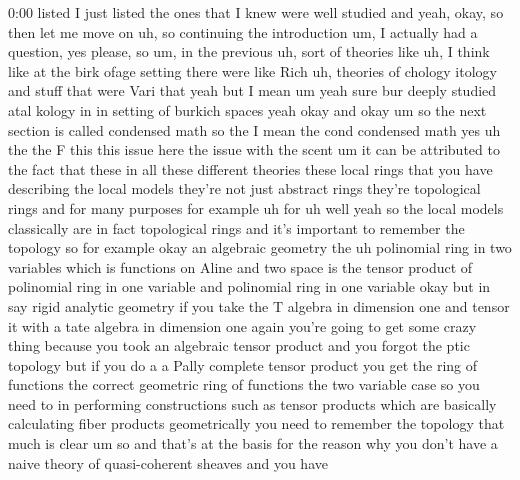 \begin{unfinished}{0:00}
 listed I just listed the ones that I knew were well studied and yeah, okay, so then let me move on uh, so continuing the introduction um, I actually had a question, yes please, so um, in the previous uh, sort of theories like uh, I think like at the birk ofage setting there were like Rich uh, theories of chology itology and stuff that were Vari that yeah but I mean um yeah sure bur deeply studied atal kology in in setting of burkich spaces yeah okay and okay um so the next section is called condensed math so the I mean the cond condensed math yes uh the the F this this issue here the issue with the scent um it can be attributed to the fact that these in all these different theories these local rings that you have describing the local models they're not just abstract rings they're topological rings and for many purposes for example uh for uh well yeah so the local models classically are in fact topological rings and it's important to remember the topology so for example okay an algebraic geometry the uh polinomial ring in two variables which is functions on Aline and two space is the tensor product of polinomial ring in one variable and polinomial ring in one variable okay but in say rigid analytic geometry if you take the T algebra in dimension one and tensor it with a tate algebra in dimension one again you're going to get some crazy thing because you took an algebraic tensor product and you forgot the ptic topology but if you do a a Pally complete tensor product you get the ring of functions the correct geometric ring of functions the two variable case so you need to in performing constructions such as tensor products which are basically calculating fiber products geometrically you need to remember the topology that much is clear um so and that's at the basis for the reason why you don't have a naive theory of quasi-coherent sheaves and you have


\end{unfinished}
